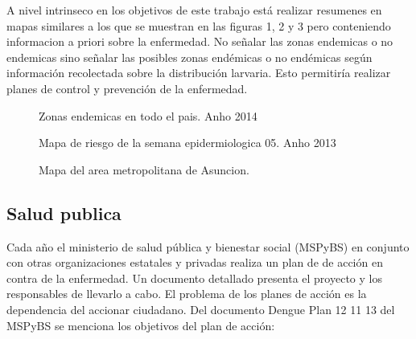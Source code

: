 A nivel intrinseco en los objetivos de este trabajo está realizar resumenes en mapas similares a los que se muestran en las figuras 1, 2 y 3 pero conteniendo informacion a priori sobre la enfermedad. No señalar las zonas endemicas o no endemicas sino señalar las posibles zonas endémicas o no endémicas según información recolectada sobre la distribución larvaria. Esto permitiría realizar planes de control y prevención de la enfermedad.\\

\begin{figure}
\centering
\caption{\label{fig:mapa1}Zonas endemicas en todo el pais. Anho 2014}
\end{figure}

\begin{figure}
\centering
\caption{\label{fig:mapa2}Mapa de riesgo de la semana epidermiologica 05. Anho 2013 }
\end{figure}

\begin{figure}
\centering
\caption{\label{fig:mapa3}Mapa del area metropolitana de Asuncion.}
\end{figure}

\subsection{Salud publica}
Cada año el ministerio de salud pública y bienestar social (MSPyBS) en conjunto con otras organizaciones estatales y privadas realiza un plan de de acción en contra de la enfermedad. Un documento detallado presenta el proyecto y los responsables de llevarlo a cabo. El problema de los planes de acción es la dependencia del accionar ciudadano. 
Del documento Dengue Plan 12 11 13 del MSPyBS se menciona los objetivos del plan de acción: \\

